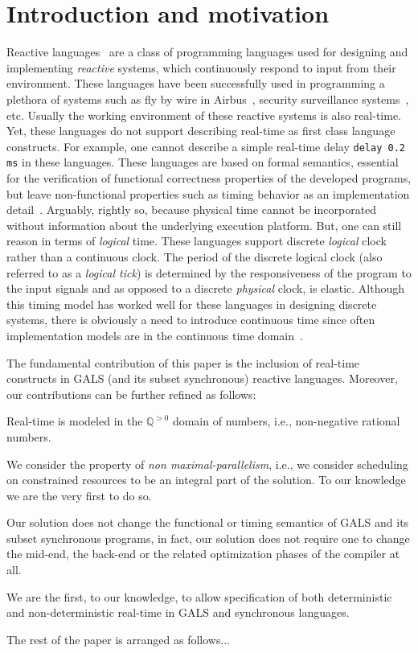\section{Introduction and motivation}
\label{sec:intr-motiv}

Reactive languages~\cite{gber05,amal10} are a class of programming
languages used for designing and implementing \textit{reactive} systems,
which continuously respond to input from their environment. These
languages have been successfully used in programming a plethora of
systems such as fly by wire in Airbus~\cite{eairbus}, security
surveillance systems~\cite{amal121}, etc. Usually the working
environment of these reactive systems is also real-time. Yet, these
languages do not support describing real-time as first class language
constructs. For example, one cannot describe a simple real-time delay
\texttt{delay 0.2 ms} in these languages. These languages are based on
formal semantics, essential for the verification of functional
correctness properties of the developed programs, but leave
non-functional properties such as timing behavior as an implementation
detail~\cite{ringler00,boldt07}. Arguably, rightly so, because physical
time cannot be incorporated without information about the underlying
execution platform. But, one can still reason in terms of
\textit{logical} time. These languages support discrete \textit{logical}
clock rather than a continuous clock. The period of the discrete logical
clock (also referred to as a \textit{logical tick}) is determined by the
responsiveness of the program to the input signals and as opposed to a
discrete \textit{physical} clock, is elastic. Although this timing model
has worked well for these languages in designing discrete systems, there
is obviously a need to introduce continuous time since often
implementation models are in the continuous time
domain~\cite{DBLP:journals/pieee/SifakisTY03}.



The fundamental contribution of this paper is the inclusion of real-time
constructs in GALS (and its subset synchronous) reactive
languages. Moreover, our contributions can be further refined as
follows:

\begin{enumerate*}
\item Real-time is modeled in the $\mathbb{Q}^{>0}$ domain of numbers,
  i.e., non-negative rational numbers.
\item We consider the property of \textit{non maximal-parallelism},
  i.e., we consider scheduling on constrained resources to be an
  integral part of the solution. To our knowledge we are the very first
  to do so.
\item Our solution does not change the functional or timing semantics of
  GALS and its subset synchronous programs, in fact, our solution does
  not require one to change the mid-end, the back-end or the related
  optimization phases of the compiler at all.
\item We are the first, to our knowledge, to allow specification of both
  deterministic and non-deterministic real-time in GALS and synchronous
  languages.
\end{enumerate*}

The rest of the paper is arranged as follows...


